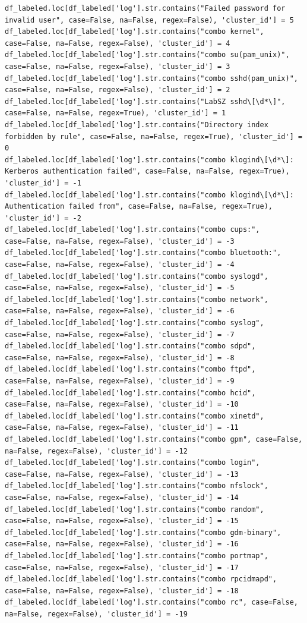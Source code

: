 \begin{lstlisting}[caption={Label der Groud-Truth Klassen}, label={lst:gt-labeling}]
df_labeled.loc[df_labeled['log'].str.contains("Failed password for invalid user", case=False, na=False, regex=False), 'cluster_id'] = 5
df_labeled.loc[df_labeled['log'].str.contains("combo kernel", case=False, na=False, regex=False), 'cluster_id'] = 4
df_labeled.loc[df_labeled['log'].str.contains("combo su(pam_unix)", case=False, na=False, regex=False), 'cluster_id'] = 3
df_labeled.loc[df_labeled['log'].str.contains("combo sshd(pam_unix)", case=False, na=False, regex=False), 'cluster_id'] = 2
df_labeled.loc[df_labeled['log'].str.contains("LabSZ sshd\[\d*\]", case=False, na=False, regex=True), 'cluster_id'] = 1
df_labeled.loc[df_labeled['log'].str.contains("Directory index forbidden by rule", case=False, na=False, regex=True), 'cluster_id'] = 0
df_labeled.loc[df_labeled['log'].str.contains("combo klogind\[\d*\]: Kerberos authentication failed", case=False, na=False, regex=True), 'cluster_id'] = -1
df_labeled.loc[df_labeled['log'].str.contains("combo klogind\[\d*\]: Authentication failed from", case=False, na=False, regex=True), 'cluster_id'] = -2
df_labeled.loc[df_labeled['log'].str.contains("combo cups:", case=False, na=False, regex=False), 'cluster_id'] = -3
df_labeled.loc[df_labeled['log'].str.contains("combo bluetooth:", case=False, na=False, regex=False), 'cluster_id'] = -4
df_labeled.loc[df_labeled['log'].str.contains("combo syslogd", case=False, na=False, regex=False), 'cluster_id'] = -5
df_labeled.loc[df_labeled['log'].str.contains("combo network", case=False, na=False, regex=False), 'cluster_id'] = -6
df_labeled.loc[df_labeled['log'].str.contains("combo syslog", case=False, na=False, regex=False), 'cluster_id'] = -7
df_labeled.loc[df_labeled['log'].str.contains("combo sdpd", case=False, na=False, regex=False), 'cluster_id'] = -8
df_labeled.loc[df_labeled['log'].str.contains("combo ftpd", case=False, na=False, regex=False), 'cluster_id'] = -9
df_labeled.loc[df_labeled['log'].str.contains("combo hcid", case=False, na=False, regex=False), 'cluster_id'] = -10
df_labeled.loc[df_labeled['log'].str.contains("combo xinetd", case=False, na=False, regex=False), 'cluster_id'] = -11
df_labeled.loc[df_labeled['log'].str.contains("combo gpm", case=False, na=False, regex=False), 'cluster_id'] = -12
df_labeled.loc[df_labeled['log'].str.contains("combo login", case=False, na=False, regex=False), 'cluster_id'] = -13
df_labeled.loc[df_labeled['log'].str.contains("combo nfslock", case=False, na=False, regex=False), 'cluster_id'] = -14
df_labeled.loc[df_labeled['log'].str.contains("combo random", case=False, na=False, regex=False), 'cluster_id'] = -15
df_labeled.loc[df_labeled['log'].str.contains("combo gdm-binary", case=False, na=False, regex=False), 'cluster_id'] = -16
df_labeled.loc[df_labeled['log'].str.contains("combo portmap", case=False, na=False, regex=False), 'cluster_id'] = -17
df_labeled.loc[df_labeled['log'].str.contains("combo rpcidmapd", case=False, na=False, regex=False), 'cluster_id'] = -18
df_labeled.loc[df_labeled['log'].str.contains("combo rc", case=False, na=False, regex=False), 'cluster_id'] = -19

\end{lstlisting}


